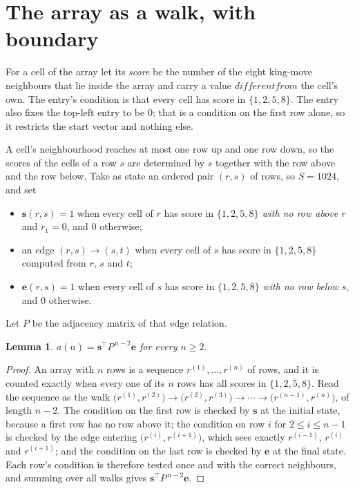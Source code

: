 \documentclass[11pt,a4paper]{article}
\theoremstyle{plain}
\newtheorem{lemma}[theorem]{Lemma}
\theoremstyle{definition}
\begin{document}
\section{The array as a walk, with boundary}

For a cell of the array let its \emph{score} be the number of the eight king-move neighbours that lie inside
the array and carry a value $different from$ the cell's own. The entry's condition is that every cell
has score in $\{1,2,5,8\}$. The entry also fixes the top-left entry to be $0$; that is a condition on the first row alone, so it restricts the start vector and nothing else.

A cell's neighbourhood reaches at most one row up and one row down, so the scores of the
cells of a row $s$ are determined by $s$ together with the row above and the row below.
Take as state an ordered pair $(r,s)$ of rows, so $S=1024$, and set
\begin{itemize}
\item $\mathbf{s}(r,s)=1$ when every cell of $r$ has score in $\{1,2,5,8\}$ \emph{with no row
above $r$} and $r_1=0$, and $0$ otherwise;
\item an edge $(r,s)\to(s,t)$ when every cell of $s$ has score in $\{1,2,5,8\}$ computed from
$r$, $s$ and $t$;
\item $\mathbf{e}(r,s)=1$ when every cell of $s$ has score in $\{1,2,5,8\}$ \emph{with no row
below $s$}, and $0$ otherwise.
\end{itemize}
Let $P$ be the adjacency matrix of that edge relation.

\begin{lemma}\label{lem:walk}
$a(n)=\mathbf{s}^{\!\top}P^{\,n-2}\mathbf{e}$ for every $n\ge2$.
\end{lemma}

\begin{proof}
An array with $n$ rows is a sequence $r^{(1)},\dots,r^{(n)}$ of rows, and it is counted
exactly when every one of its $n$ rows has all scores in $\{1,2,5,8\}$. Read the sequence as the
walk $\bigl(r^{(1)},r^{(2)}\bigr)\to\bigl(r^{(2)},r^{(3)}\bigr)\to\cdots\to
\bigl(r^{(n-1)},r^{(n)}\bigr)$, of length $n-2$. The condition on the first row is
checked by $\mathbf{s}$ at the initial state, because a first row has no row above it; the
condition on row $i$ for $2\le i\le n-1$ is checked by the edge entering
$\bigl(r^{(i)},r^{(i+1)}\bigr)$, which sees exactly $r^{(i-1)}$, $r^{(i)}$ and
$r^{(i+1)}$; and the condition on the last row is checked by $\mathbf{e}$ at the final
state. Each row's condition is therefore tested once and with the correct neighbours, and
summing over all walks gives $\mathbf{s}^{\!\top}P^{\,n-2}\mathbf{e}$.
\end{proof}
\end{document}
